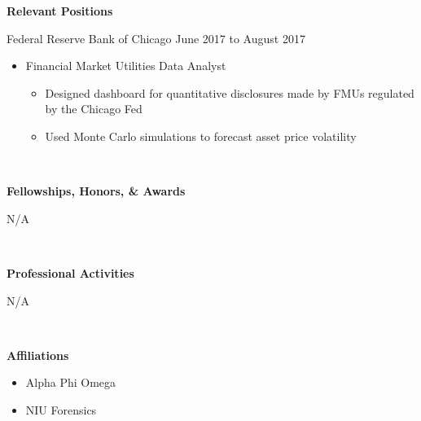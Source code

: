 \documentclass[final]{article}
\begin{document}
	\begin{minipage}[t]{.20\textwidth}
		\Large{\textbf{Relevant \mbox{Positions}}}\\
	\end{minipage}
	\begin{minipage}[t]{.80\textwidth}
		Federal Reserve Bank of Chicago \hfill June 2017 to August 2017
		\begin{itemize}
			\item Financial Market Utilities Data Analyst
			\begin{itemize}
				\item Designed dashboard for quantitative disclosures made by FMUs regulated by the Chicago Fed
				\item Used Monte Carlo simulations to forecast asset price volatility 
			\end{itemize} 
		\end{itemize}
	\end{minipage}\\

	\begin{minipage}[t]{.20\textwidth}
		\raggedright
		\Large{\textbf{Fellowships, Honors,  \& Awards }}\\
	\end{minipage}
	\begin{minipage}[t]{.80\textwidth}
		\hfil N/A\\
	\end{minipage}\\
	\begin{minipage}[t]{.20\textwidth}
		\raggedright
		\Large{\textbf{Professional Activities}}\\
	\end{minipage}
	\begin{minipage}[t]{.80\textwidth}
		\hfil N/A
	\end{minipage}\\

	\begin{minipage}[t]{.20\textwidth}
		\Large{\textbf{Affiliations}} \\
	\end{minipage}
	\begin{minipage}[t]{.80\textwidth}
		\begin{itemize}
			\item Alpha Phi Omega
			\item NIU Forensics
		\end{itemize}
	\end{minipage}\\
\end{document}
